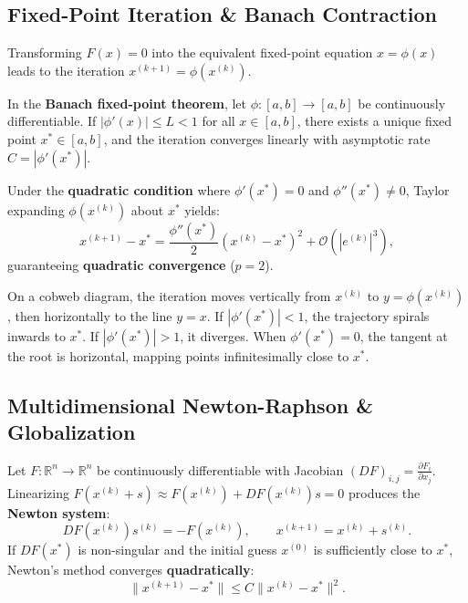 \subsection{Fixed-Point Iteration \& Banach Contraction}

Transforming $F(x) = 0$ into the equivalent fixed-point equation $x = \phi(x)$ leads to the iteration $x^{(k+1)} = \phi(x^{(k)})$.

\begin{theorem}
    In the \textbf{Banach fixed-point theorem}, let $\phi: [a, b] \to [a, b]$ be continuously differentiable. If $|\phi'(x)| \le L < 1$ for all $x \in [a, b]$, there exists a unique fixed point $x^* \in [a, b]$, and the iteration converges linearly with asymptotic rate $C = |\phi'(x^*)|$.
    
    Under the \textbf{quadratic condition} where $\phi'(x^*) = 0$ and $\phi''(x^*) \neq 0$, Taylor expanding $\phi(x^{(k)})$ about $x^*$ yields:
    \begin{equation}
        x^{(k+1)} - x^* = \frac{\phi''(x^*)}{2}(x^{(k)} - x^*)^2 + \mathcal{O}(|e^{(k)}|^3),
    \end{equation}
    guaranteeing \textbf{quadratic convergence} ($p=2$).
\end{theorem}

On a cobweb diagram, the iteration moves vertically from $x^{(k)}$ to $y = \phi(x^{(k)})$, then horizontally to the line $y = x$. If $|\phi'(x^*)| < 1$, the trajectory spirals inwards to $x^*$. If $|\phi'(x^*)| > 1$, it diverges. When $\phi'(x^*) = 0$, the tangent at the root is horizontal, mapping points infinitesimally close to $x^*$.

\subsection{Multidimensional Newton-Raphson \& Globalization}

Let $F: \mathbb{R}^n \to \mathbb{R}^n$ be continuously differentiable with Jacobian $(DF)_{i,j} = \frac{\partial F_i}{\partial x_j}$. Linearizing $F(x^{(k)} + s) \approx F(x^{(k)}) + DF(x^{(k)}) s = 0$ produces the \textbf{Newton system}:
\begin{equation}
    DF(x^{(k)}) s^{(k)} = -F(x^{(k)}), \qquad x^{(k+1)} = x^{(k)} + s^{(k)}.
\end{equation}
If $DF(x^*)$ is non-singular and the initial guess $x^{(0)}$ is sufficiently close to $x^*$, Newton's method converges \textbf{quadratically}:
\begin{equation}
    \|x^{(k+1)} - x^*\| \le C \|x^{(k)} - x^*\|^2.
\end{equation}

